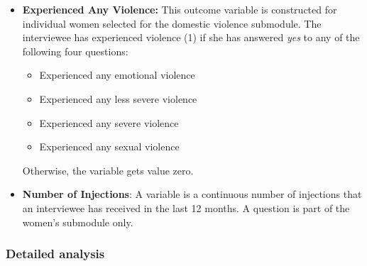 \documentclass[12pt,a4paper,notitlepage]{article}
\begin{document}
\begin{itemize}
    \item \textbf{Experienced Any Violence:} This outcome variable is constructed for individual women selected for the domestic violence submodule. The interviewee has experienced violence (1) if she has answered \textit{yes} to any of the following four questions:
    \begin{itemize}
        \item Experienced any emotional violence
        \item Experienced any less severe violence
        \item Experienced any severe violence
        \item Experienced any sexual violence
    \end{itemize}
    Otherwise, the variable gets value zero.
    \item \textbf{Number of Injections}: A variable is a continuous number of injections that an interviewee has received in the last 12 months. A question is part of the women's submodule only.
\end{itemize}

\subsubsection{Detailed analysis} \label{subsubsec:detailedAnalysis}
\end{document}
